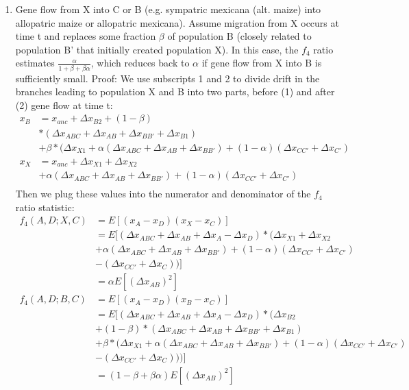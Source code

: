 \documentclass[12pt]{report}
\begin{document}
\begin{enumerate}
	\item Gene flow from X into C or B (e.g. sympatric mexicana (alt. maize) into allopatric maize or allopatric mexicana).
	Assume migration from X occurs at time t and replaces some fraction $\beta$ of population B (closely related to population B' that initially created population X). In this case, the $f_4$ ratio estimates $\frac{\alpha}{1 + \beta + \beta\alpha}$, which reduces back to $\alpha$ if gene flow from X into B is sufficiently small. Proof:
	We use subscripts 1 and 2 to divide drift in the branches leading to population X and B into two parts, before (1) and after (2) gene flow at time t:
	\begin{align*}
	x_B &= x_{anc} + \Delta{x_{B2}} + (1 - \beta)\\
	&*(\Delta{x_{ABC}} + \Delta{x_{AB}} + \Delta{x_{BB'}} + \Delta{x_{B1}}) \\
	&+ \beta*(\Delta{x_{X1}} + \alpha(\Delta{x_{ABC}} + \Delta{x_{AB}} + \Delta{x_{BB'}}) + (1 - \alpha)(\Delta{x_{CC'}} + \Delta{x_{C'}})\\
	x_X &= x_{anc} + \Delta{x_{X1}} + \Delta{x_{X2}} \\
	&+ \alpha(\Delta{x_{ABC}} + \Delta{x_{AB}} + \Delta{x_{BB'}}) + (1 - \alpha)(\Delta{x_{CC'}} + \Delta{x_{C'}})\\
	\end{align*}
	Then we plug these values into the numerator and denominator of the $f_4$ ratio statistic:
	\begin{align*}
	f_4(A,D;X,C) &= E[(x_A - x_D)(x_X - x_C)] \\
	&= E[(\Delta{x_{ABC}} + \Delta{x_{AB}} + \Delta{x_{A}} - \Delta{x_{D}})*(\Delta{x_{X1}} + \Delta{x_{X2}} \\
	&+ \alpha(\Delta{x_{ABC}} + \Delta{x_{AB}} + \Delta{x_{BB'}}) + (1 - \alpha)(\Delta{x_{CC'}} + \Delta{x_{C'}}) \\
	&- (\Delta{x_{CC'}} + \Delta{x_{C}}))]\\
	&=\alpha E[(\Delta{x_{AB}})^2]\\
	f_4(A,D;B,C) &= E[(x_A - x_D)(x_B - x_C)] \\
	&= E[(\Delta{x_{ABC}} + \Delta{x_{AB}} + \Delta{x_{A}} - \Delta{x_{D}})*(\Delta{x_{B2}} \\
	&+ (1 - \beta)*(\Delta{x_{ABC}} + \Delta{x_{AB}} + \Delta{x_{BB'}} + \Delta{x_{B1}}) \\
	&+ \beta*(\Delta{x_{X1}} + \alpha(\Delta{x_{ABC}} + \Delta{x_{AB}} + \Delta{x_{BB'}}) + (1 - \alpha)(\Delta{x_{CC'}} + \Delta{x_{C'}}) \\
	&- (\Delta{x_{CC'}} + \Delta{x_{C}})))]\\
	&=(1 - \beta + \beta\alpha)E[(\Delta{x_{AB}})^2]
	\end{align*}
	

\end{enumerate}
\end{document}
